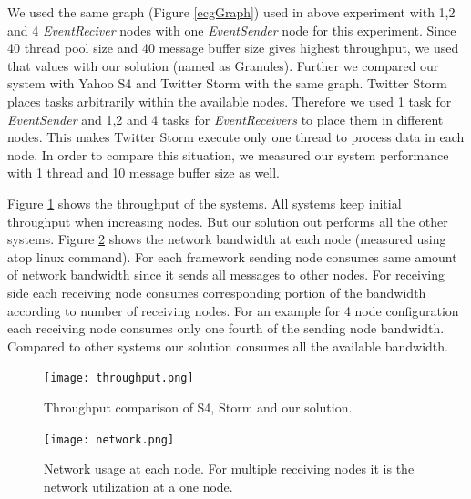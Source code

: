 We used the same graph (Figure \ref{ecgGraph}) used in above experiment with 1,2 and 4 \textit{EventReciver} nodes with one \textit{EventSender} node for this experiment. Since 40 thread pool size and 40 message buffer size gives highest throughput, we used that values with our solution (named as Granules). Further we compared our system with Yahoo S4 \cite{neumeyer2010s4} and Twitter Storm \cite{toshniwal2014storm} with the same graph. Twitter Storm \cite{toshniwal2014storm} places tasks arbitrarily within the available nodes. Therefore we used 1 task for \textit{EventSender} and 1,2 and 4 tasks for \textit{EventReceivers} to place them in different nodes. This makes Twitter Storm \cite{toshniwal2014storm} execute only one thread to process data in each node. In order to compare this situation, we measured our system performance with 1 thread and 10 message buffer size as well.   

Figure \ref{throuput} shows the throughput of the systems. All systems keep initial throughput when increasing nodes. But our solution out performs all the other systems. Figure \ref{networkusage} shows the network bandwidth at each node (measured using atop linux command). For each framework sending node consumes same amount of network bandwidth since it sends all messages to other nodes. For receiving side each receiving node consumes corresponding portion of the bandwidth according to number of receiving nodes. For an example for 4 node configuration each receiving node consumes only one fourth of the sending node bandwidth. Compared to other systems our solution consumes all the available bandwidth. 

\begin{figure}[!t]
        \centering
        \texttt{[image: throughput.png]}
        \caption{Throughput comparison of S4, Storm and our solution.}
        \label{throuput}
\end{figure}

\begin{figure}[!t]
        \centering
        \texttt{[image: network.png]}
        \caption{Network usage at each node. For multiple receiving nodes it is the network utilization at a one node.}
        \label{networkusage}
\end{figure}


